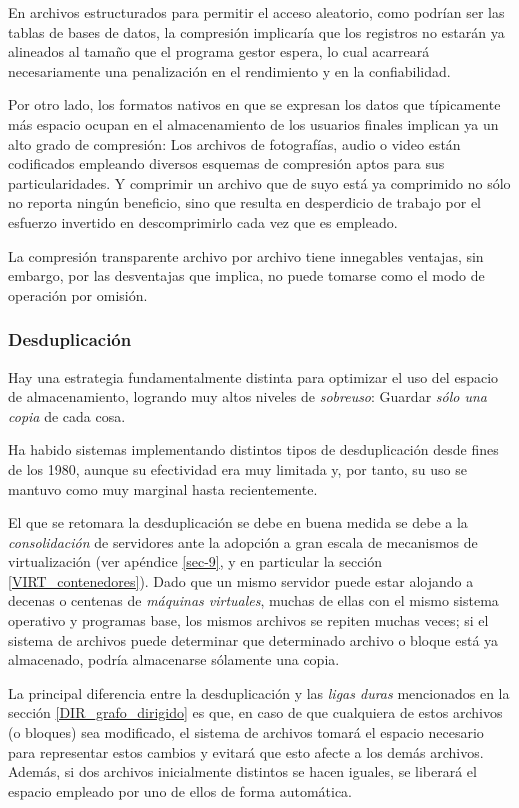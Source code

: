 \documentclass[11pt,fleqn]{book} %
\begin{document}
En archivos estructurados para permitir el acceso aleatorio, como
podrían ser las tablas de bases de datos, la compresión implicaría que
los registros no estarán ya  alineados al tamaño que el
programa gestor espera, lo cual acarreará necesariamente una
penalización en el rendimiento y en la confiabilidad.

Por otro lado, los formatos nativos en que se expresan los datos que
típicamente más espacio ocupan en el almacenamiento de los usuarios
finales implican ya un alto grado de compresión: Los archivos de
fotografías, audio o video están codificados empleando diversos
esquemas de compresión aptos para sus particularidades. Y comprimir un
archivo que de suyo está ya comprimido no sólo no reporta ningún
beneficio, sino que resulta en desperdicio de trabajo por el esfuerzo
invertido en descomprimirlo cada vez que es empleado.

La compresión transparente archivo por archivo tiene innegables
ventajas, sin embargo, por las desventajas que implica, no puede
tomarse como el modo de operación por omisión.
\subsubsection{Desduplicación}
\label{sec-7-1-5-3}


Hay una estrategia fundamentalmente distinta para optimizar el uso del
espacio de almacenamiento, logrando muy altos niveles de \emph{sobreuso}:
Guardar \emph{sólo una copia} de cada cosa.

Ha habido sistemas implementando distintos tipos de desduplicación
desde fines de los 1980, aunque su efectividad era muy limitada y, por
tanto, su uso se mantuvo como muy marginal hasta recientemente.

El que se retomara la desduplicación se debe en buena medida se debe a
la \emph{consolidación} de servidores ante la adopción a gran escala de
mecanismos de virtualización (ver apéndice \ref{sec-9}, y en particular
la sección \ref{VIRT_contenedores}). Dado que un mismo servidor puede
estar alojando a decenas o centenas de \emph{máquinas virtuales}, muchas de
ellas con el mismo sistema operativo y programas base, los mismos archivos se repiten
muchas veces; si el sistema de archivos puede determinar que
determinado archivo o bloque está ya almacenado, podría almacenarse
sólamente una copia.

La principal diferencia entre la desduplicación y las \emph{ligas duras}
mencionados en la sección \ref{DIR_grafo_dirigido} es que, en caso
de que cualquiera de estos archivos (o bloques) sea modificado, el
sistema de archivos tomará el espacio necesario para representar estos
cambios y evitará que esto afecte a los demás archivos. Además, si dos
archivos inicialmente distintos se hacen iguales, se liberará el
espacio empleado por uno de ellos de forma automática.
\end{document}
